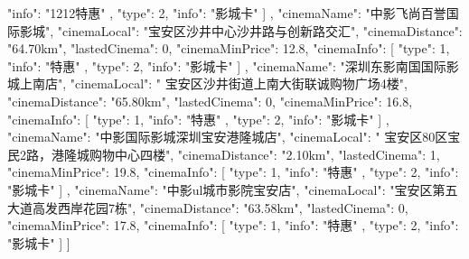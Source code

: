 {{{{                        "info": "1212特惠"
                    },
                    {
                        "type": 2,
                        "info": "影城卡"
                    }
                ]
            },
            {
                "cinemaName": "中影飞尚百誉国际影城",
                "cinemaLocal": "宝安区沙井中心沙井路与创新路交汇",
                "cinemaDistance": "64.70km",
                "lastedCinema": 0,
                "cinemaMinPrice": 12.8,
                "cinemaInfo": [
                    {
                        "type": 1,
                        "info": "特惠"
                    },
                    {
                        "type": 2,
                        "info": "影城卡"
                    }
                ]
            },
            {
                "cinemaName": "深圳东影南国国际影城上南店",
                "cinemaLocal": " 宝安区沙井街道上南大街联诚购物广场4楼",
                "cinemaDistance": "65.80km",
                "lastedCinema": 0,
                "cinemaMinPrice": 16.8,
                "cinemaInfo": [
                    {
                        "type": 1,
                        "info": "特惠"
                    },
                    {
                        "type": 2,
                        "info": "影城卡"
                    }
                ]
            },
            {
                "cinemaName": "中影国际影城深圳宝安港隆城店",
                "cinemaLocal": " 宝安区80区宝民2路，港隆城购物中心四楼",
                "cinemaDistance": "2.10km",
                "lastedCinema": 1,
                "cinemaMinPrice": 19.8,
                "cinemaInfo": [
                    {
                        "type": 1,
                        "info": "特惠"
                    },
                    {
                        "type": 2,
                        "info": "影城卡"
                    }
                ]
            },
            {
                "cinemaName": "中影ul城市影院宝安店",
                "cinemaLocal": "宝安区第五大道高发西岸花园7栋",
                "cinemaDistance": "63.58km",
                "lastedCinema": 0,
                "cinemaMinPrice": 17.8,
                "cinemaInfo": [
                    {
                        "type": 1,
                        "info": "特惠"
                    },{
                        "type": 2,
                        "info": "影城卡"
                    }
                ]
            }
        ]
    }
}
